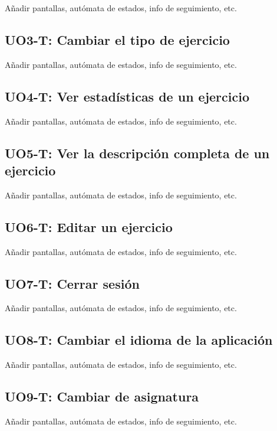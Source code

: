Añadir pantallas, autómata de estados, info de seguimiento, etc.\\

\subsection{UO3-T: Cambiar el tipo de ejercicio}
\label{analisis-de-requisitos:funcionales:uo3t}

Añadir pantallas, autómata de estados, info de seguimiento, etc.\\

\subsection{UO4-T: Ver estadísticas de un ejercicio}
\label{analisis-de-requisitos:funcionales:uo4t}

Añadir pantallas, autómata de estados, info de seguimiento, etc.\\

\subsection{UO5-T: Ver la descripción completa de un ejercicio}
\label{analisis-de-requisitos:funcionales:uo5t}

Añadir pantallas, autómata de estados, info de seguimiento, etc.\\

\subsection{UO6-T: Editar un ejercicio}
\label{analisis-de-requisitos:funcionales:uo6t}

Añadir pantallas, autómata de estados, info de seguimiento, etc.\\

\subsection{UO7-T: Cerrar sesión}
\label{analisis-de-requisitos:funcionales:uo7t}

Añadir pantallas, autómata de estados, info de seguimiento, etc.\\

\subsection{UO8-T: Cambiar el idioma de la aplicación}
\label{analisis-de-requisitos:funcionales:uo8t}

Añadir pantallas, autómata de estados, info de seguimiento, etc.\\

\subsection{UO9-T: Cambiar de asignatura}
\label{analisis-de-requisitos:funcionales:uo9t}

Añadir pantallas, autómata de estados, info de seguimiento, etc.\\